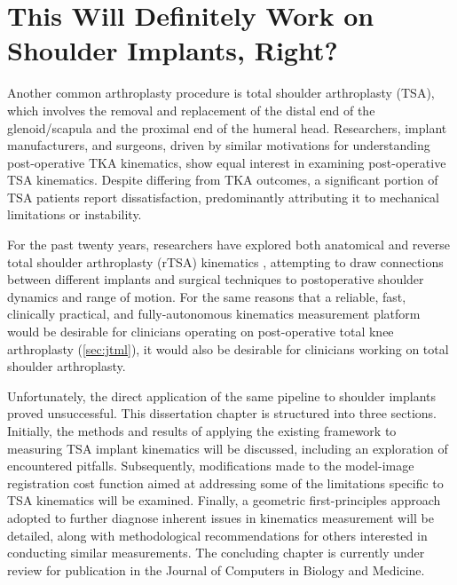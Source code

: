 \chapter{This Will Definitely Work on Shoulder Implants, Right?}{\renewcommand*{\thefootnote}{\fnsymbol{footnote}}

Another common arthroplasty procedure is total shoulder arthroplasty (TSA), which involves the removal and replacement of the distal end of the glenoid/scapula and the proximal end of the humeral head.
Researchers, implant manufacturers, and surgeons, driven by similar motivations for understanding post-operative TKA kinematics, show equal interest in examining post-operative TSA kinematics.
Despite differing from TKA outcomes, a significant portion of TSA patients report dissatisfaction, predominantly attributing it to mechanical limitations or instability.

For the past twenty years, researchers have explored both anatomical and reverse total shoulder arthroplasty (rTSA) kinematics \cite{kijimaVivo3dimensionalAnalysis2015,matsukiVivo3DAnalysis2014,matsukiDynamicVivoGlenohumeral2012,sugiComparingVivoThreedimensional2021,burtonFullyAutomaticTracking2023}, attempting to draw connections between different implants and surgical techniques to postoperative shoulder dynamics and range of motion.
For the same reasons that a reliable, fast, clinically practical, and fully-autonomous kinematics measurement platform would be desirable for clinicians operating on post-operative total knee arthroplasty (\cref{sec:jtml}), it would also be desirable for clinicians working on total shoulder arthroplasty.

Unfortunately, the direct application of the same pipeline to shoulder implants proved unsuccessful.
This dissertation chapter is structured into three sections. Initially, the methods and results of applying the existing framework to measuring TSA implant kinematics will be discussed, including an exploration of encountered pitfalls.
Subsequently, modifications made to the model-image registration cost function aimed at addressing some of the limitations specific to TSA kinematics will be examined.
Finally, a geometric first-principles approach adopted to further diagnose inherent issues in kinematics measurement will be detailed, along with methodological recommendations for others interested in conducting similar measurements.
The concluding chapter is currently under review for publication in the Journal of Computers in Biology and Medicine.

}
